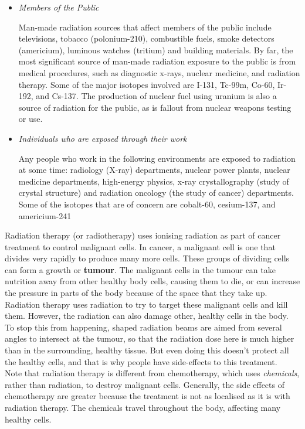 \begin{itemize}
\item{\textit{Members of the Public}

Man-made radiation sources that affect members of the public include televisions, tobacco (polonium-210), combustible fuels, smoke detectors (americium), luminous watches (tritium) and building materials. By far, the most significant source of man-made radiation exposure to the public is from medical procedures, such as diagnostic x-rays, nuclear medicine, and radiation therapy. Some of the major isotopes involved are I-131, Tc-99m, Co-60, Ir-192, and Cs-137. The production of nuclear fuel using uranium is also a source of radiation for the public, as is fallout from nuclear weapons testing or use.
}
\item{\textit{Individuals who are exposed through their work}

Any people who work in the following environments are exposed to radiation at some time: radiology (X-ray) departments, nuclear power plants, nuclear medicine departments, high-energy physics, x-ray crystallography (study of crystal structure) and radiation oncology (the study of cancer) departments. Some of the isotopes that are of concern are cobalt-60, cesium-137, and americium-241}
\end{itemize}



\begin{IFact}{
Radiation therapy (or radiotherapy) uses ionising radiation as part of cancer treatment to control malignant cells. In cancer, a malignant cell is one that divides very rapidly to produce many more cells. These groups of dividing cells can form a growth or \textbf{tumour}. The malignant cells in the tumour can take nutrition away from other healthy body cells, causing them to die, or can increase the pressure in parts of the body because of the space that they take up. Radiation therapy uses radiation to try to target these malignant cells and kill them. However, the radiation can also damage other, healthy cells in the body. To stop this from happening, shaped radiation beams are aimed from several angles to intersect at the tumour, so that the radiation dose here is much higher than in the surrounding, healthy tissue. But even doing this doesn't protect all the healthy cells, and that is why people have side-effects to this treatment. \\

Note that radiation therapy is different from chemotherapy, which uses \textit{chemicals}, rather than radiation, to destroy malignant cells. Generally, the side effects of chemotherapy are greater because the treatment is not as localised as it is with radiation therapy. The chemicals travel throughout the body, affecting many healthy cells.
}
\end{IFact}
\


